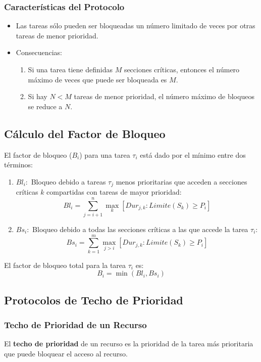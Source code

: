 \documentclass[a4paper,12pt]{article}
\begin{document}
\subsubsection{Características del Protocolo}
\begin{itemize}
    \item Las tareas sólo pueden ser bloqueadas un número limitado de veces por otras tareas de menor prioridad.
    \item Consecuencias:
    \begin{enumerate}
        \item Si una tarea tiene definidas \(M\) secciones críticas, entonces el número máximo de veces que puede ser bloqueada es \(M\).
        \item Si hay \(N < M\) tareas de menor prioridad, el número máximo de bloqueos se reduce a \(N\).
    \end{enumerate}
\end{itemize}

\subsection{Cálculo del Factor de Bloqueo}

El factor de bloqueo (\(B_i\)) para una tarea \(\tau_i\) está dado por el mínimo entre dos términos:

\begin{enumerate}
    \item \(Bl_i:\) Bloqueo debido a tareas \(\tau_j\) menos prioritarias que acceden a secciones críticas \(k\) compartidas con tareas de mayor prioridad:
    \[
    Bl_i = \sum_{j=i+1}^{n} \max_k[Dur_{j,k} : Limite(S_k) \geq P_i]
    \]

    \item \(Bs_i:\) Bloqueo debido a todas las secciones críticas a las que accede la tarea \(\tau_i\):
    \[
    Bs_i = \sum_{k=1}^{m} \max_{j>i}[Dur_{j,k} : Limite(S_k) \geq P_i]
    \]
\end{enumerate}

El factor de bloqueo total para la tarea \(\tau_i\) es:
\[
B_i = \min(Bl_i, Bs_i)
\]

\subsection{Protocolos de Techo de Prioridad}

\subsubsection{Techo de Prioridad de un Recurso}
El \textbf{techo de prioridad} de un recurso es la prioridad de la tarea más prioritaria que puede bloquear el acceso al recurso.
\end{document}
